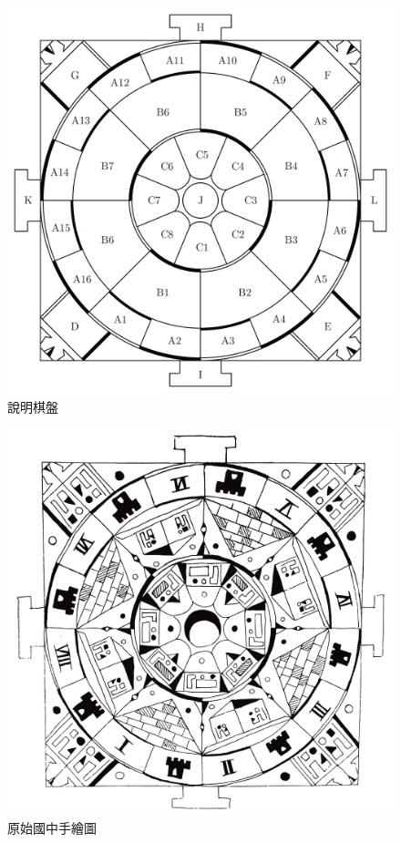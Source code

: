 \documentclass[11pt,a4paper]{article}
\begin{document}
\begin{figure}
	\caption{說明棋盤}
	\label{b}
	\centerline{ \includegraphics[scale = 0.4]{mandala-explain} }
\end{figure}

\begin{figure}
	\caption{原始國中手繪圖}
	\label{c}
	\centerline{ \includegraphics[scale = 0.4]{mandala-traced-01} }
\end{figure}
\end{document}
